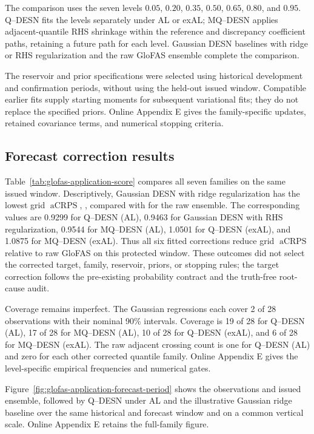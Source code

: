 \documentclass[12pt,letterpaper]{article}
\numberwithin{equation}{section}
\newcommand{\aCRPS}{\operatorname{aCRPS}}
\begin{document}
The comparison uses the seven levels \(0.05\), \(0.20\), \(0.35\), \(0.50\),
\(0.65\), \(0.80\), and \(0.95\). Q--DESN fits the levels separately under
AL or exAL; MQ--DESN applies adjacent-quantile RHS shrinkage within the
reference and discrepancy coefficient paths, retaining a future path for
each level. Gaussian DESN baselines with ridge or RHS regularization and
the raw GloFAS ensemble complete the comparison.

The reservoir and prior specifications were selected using historical
development and confirmation periods, without using the held-out issued
window. Compatible earlier fits supply starting moments for subsequent
variational fits; they do not replace the specified priors. Online Appendix E
gives the family-specific updates, retained covariance terms, and numerical
stopping criteria.

\subsection{Forecast correction results}

Table~\ref{tab:glofas-application-score} compares all seven families on the
same issued window. Descriptively, Gaussian DESN with ridge regularization
has the lowest grid \(\aCRPS\), \GlofasApplicationCurrentNormalRidgeAcrps{},
compared with \GlofasApplicationCurrentRawAcrps{} for the raw ensemble.
The corresponding values are 0.9299 for Q--DESN (AL), 0.9463 for Gaussian
DESN with RHS regularization, 0.9544 for MQ--DESN (AL), 1.0501 for Q--DESN
(exAL), and 1.0875 for MQ--DESN (exAL). Thus all six fitted corrections
reduce grid \(\aCRPS\) relative to raw GloFAS on this protected window.
These outcomes did not select the corrected target, family, reservoir,
priors, or stopping rules; the target correction follows the pre-existing
probability contract and the truth-free root-cause audit.

Coverage remains imperfect. The Gaussian regressions each cover 2 of 28
observations with their nominal 90\% intervals. Coverage is 19 of 28 for
Q--DESN (AL), 17 of 28 for MQ--DESN (AL), 10 of 28 for Q--DESN (exAL),
and 6 of 28 for MQ--DESN (exAL). The raw adjacent crossing count is one
for Q--DESN (AL) and zero for each other corrected quantile family. Online
Appendix E gives the level-specific empirical frequencies and numerical
gates.

Figure~\ref{fig:glofas-application-forecast-period} shows the observations and
issued ensemble, followed by Q--DESN under AL and the illustrative Gaussian ridge
baseline over the same historical and forecast window and on a common vertical
scale. Online Appendix E retains the full-family figure.
\end{document}
